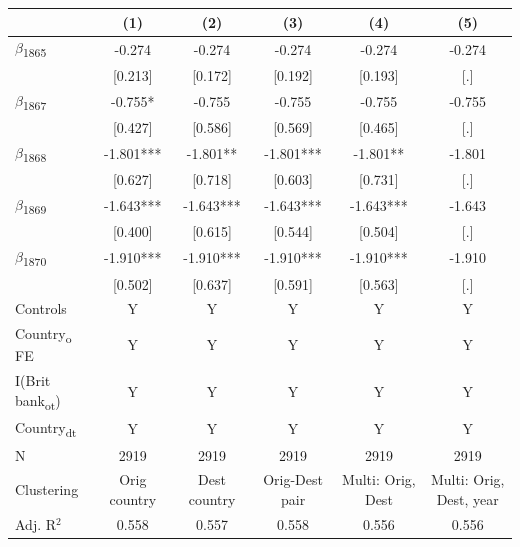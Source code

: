 {
\def\sym#1{\ifmmode^{#1}\else\(^{#1}\)\fi}
\begin{tabular}{l*{5}{c}}
\toprule
            &\multicolumn{1}{c}{(1)}   &\multicolumn{1}{c}{(2)}   &\multicolumn{1}{c}{(3)}   &\multicolumn{1}{c}{(4)}   &\multicolumn{1}{c}{(5)}   \\
\midrule
$\beta$\textsubscript{1865}&      -0.274   &      -0.274   &      -0.274   &      -0.274   &      -0.274   \\
            &     [0.213]   &     [0.172]   &     [0.192]   &     [0.193]   &         [.]   \\
$\beta$\textsubscript{1867}&      -0.755*  &      -0.755   &      -0.755   &      -0.755   &      -0.755   \\
            &     [0.427]   &     [0.586]   &     [0.569]   &     [0.465]   &         [.]   \\
$\beta$\textsubscript{1868}&      -1.801***&      -1.801** &      -1.801***&      -1.801** &      -1.801   \\
            &     [0.627]   &     [0.718]   &     [0.603]   &     [0.731]   &         [.]   \\
$\beta$\textsubscript{1869}&      -1.643***&      -1.643***&      -1.643***&      -1.643***&      -1.643   \\
            &     [0.400]   &     [0.615]   &     [0.544]   &     [0.504]   &         [.]   \\
$\beta$\textsubscript{1870}&      -1.910***&      -1.910***&      -1.910***&      -1.910***&      -1.910   \\
            &     [0.502]   &     [0.637]   &     [0.591]   &     [0.563]   &         [.]   \\
Controls    &           Y   &           Y   &           Y   &           Y   &           Y   \\
Country\textsubscript{o} FE&           Y   &           Y   &           Y   &           Y   &           Y   \\
I(Brit bank\textsubscript{ot})&           Y   &           Y   &           Y   &           Y   &           Y   \\
Country\textsubscript{dt}&           Y   &           Y   &           Y   &           Y   &           Y   \\
\midrule
N           &        2919   &        2919   &        2919   &        2919   &        2919   \\
Clustering  &Orig country   &Dest country   &Orig-Dest pair   &Multi: Orig, Dest   &Multi: Orig, Dest, year   \\
Adj. R{$^2$}&       0.558   &       0.557   &       0.558   &       0.556   &       0.556   \\
\bottomrule
\end{tabular}
}
